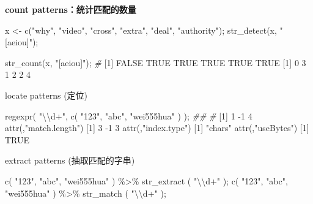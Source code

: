 \documentclass[
]{article}
\newenvironment{Shaded}{}{}
\newcommand{\CommentTok}[1]{\textcolor[rgb]{0.38,0.63,0.69}{\textit{#1}}}
\newcommand{\ConstantTok}[1]{\textcolor[rgb]{0.53,0.00,0.00}{#1}}
\newcommand{\DecValTok}[1]{\textcolor[rgb]{0.25,0.63,0.44}{#1}}
\newcommand{\DocumentationTok}[1]{\textcolor[rgb]{0.73,0.13,0.13}{\textit{#1}}}
\newcommand{\FunctionTok}[1]{\textcolor[rgb]{0.02,0.16,0.49}{#1}}
\newcommand{\NormalTok}[1]{#1}
\newcommand{\OtherTok}[1]{\textcolor[rgb]{0.00,0.44,0.13}{#1}}
\newcommand{\SpecialCharTok}[1]{\textcolor[rgb]{0.25,0.44,0.63}{#1}}
\newcommand{\StringTok}[1]{\textcolor[rgb]{0.25,0.44,0.63}{#1}}
\begin{document}
\begin{enumerate}
  \textbf{count patterns：统计匹配的数量}

\begin{Shaded}
\begin{Highlighting}[]
\NormalTok{x }\OtherTok{\textless{}{-}} \FunctionTok{c}\NormalTok{(}\StringTok{"why"}\NormalTok{, }\StringTok{"video"}\NormalTok{, }\StringTok{"cross"}\NormalTok{, }\StringTok{"extra"}\NormalTok{, }\StringTok{"deal"}\NormalTok{, }\StringTok{"authority"}\NormalTok{);}
\FunctionTok{str\_detect}\NormalTok{(x, }\StringTok{"[aeiou]"}\NormalTok{);}

\FunctionTok{str\_count}\NormalTok{(x, }\StringTok{"[aeiou]"}\NormalTok{);}
\CommentTok{\#}
\NormalTok{[}\DecValTok{1}\NormalTok{] }\ConstantTok{FALSE}  \ConstantTok{TRUE}  \ConstantTok{TRUE}  \ConstantTok{TRUE}  \ConstantTok{TRUE}  \ConstantTok{TRUE}
\NormalTok{[}\DecValTok{1}\NormalTok{] }\DecValTok{0} \DecValTok{3} \DecValTok{1} \DecValTok{2} \DecValTok{2} \DecValTok{4}
\end{Highlighting}
\end{Shaded}

  locate patterns (定位)

\begin{Shaded}
\begin{Highlighting}[]
\FunctionTok{regexpr}\NormalTok{( }\StringTok{"}\SpecialCharTok{\textbackslash{}\textbackslash{}}\StringTok{d+"}\NormalTok{, }\FunctionTok{c}\NormalTok{( }\StringTok{"123"}\NormalTok{, }\StringTok{"abc"}\NormalTok{, }\StringTok{"wei555hua"}\NormalTok{ ) ); }\DocumentationTok{\#\# }
\CommentTok{\#}
\NormalTok{[}\DecValTok{1}\NormalTok{]  }\DecValTok{1} \SpecialCharTok{{-}}\DecValTok{1}  \DecValTok{4}
\FunctionTok{attr}\NormalTok{(,}\StringTok{"match.length"}\NormalTok{)}
\NormalTok{[}\DecValTok{1}\NormalTok{]  }\DecValTok{3} \SpecialCharTok{{-}}\DecValTok{1}  \DecValTok{3}
\FunctionTok{attr}\NormalTok{(,}\StringTok{"index.type"}\NormalTok{)}
\NormalTok{[}\DecValTok{1}\NormalTok{] }\StringTok{"chars"}
\FunctionTok{attr}\NormalTok{(,}\StringTok{"useBytes"}\NormalTok{)}
\NormalTok{[}\DecValTok{1}\NormalTok{] }\ConstantTok{TRUE}
\end{Highlighting}
\end{Shaded}

  extract patterns (抽取匹配的字串)

\begin{Shaded}
\begin{Highlighting}[]
\FunctionTok{c}\NormalTok{( }\StringTok{"123"}\NormalTok{, }\StringTok{"abc"}\NormalTok{, }\StringTok{"wei555hua"}\NormalTok{ ) }\SpecialCharTok{\%\textgreater{}\%} \FunctionTok{str\_extract}\NormalTok{ ( }\StringTok{"}\SpecialCharTok{\textbackslash{}\textbackslash{}}\StringTok{d+"}\NormalTok{ );}
\FunctionTok{c}\NormalTok{( }\StringTok{"123"}\NormalTok{, }\StringTok{"abc"}\NormalTok{, }\StringTok{"wei555hua"}\NormalTok{ ) }\SpecialCharTok{\%\textgreater{}\%} \FunctionTok{str\_match}\NormalTok{ ( }\StringTok{"}\SpecialCharTok{\textbackslash{}\textbackslash{}}\StringTok{d+"}\NormalTok{ );}
\end{Highlighting}
\end{Shaded}


\end{enumerate}
\end{document}
